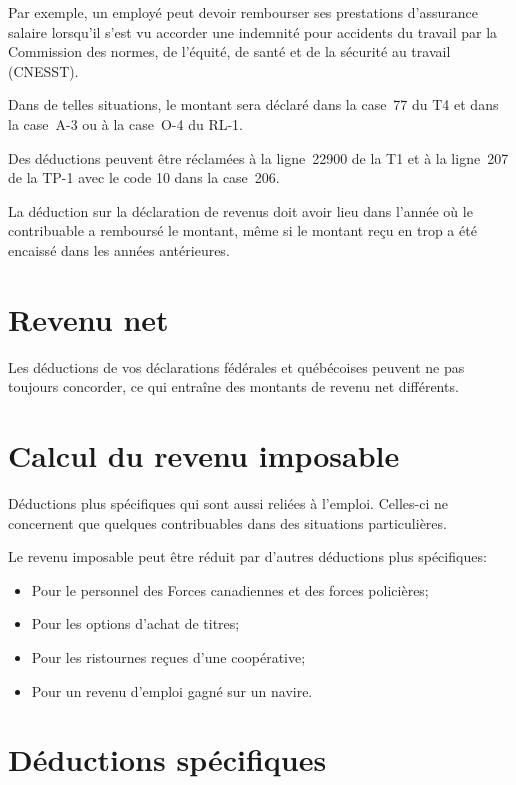 Par exemple, un employé peut devoir rembourser ses prestations d'assurance salaire lorsqu'il s'est vu accorder une indemnité pour accidents du travail par la Commission des normes, de l'équité, de santé et de la sécurité au travail (CNESST).

Dans de telles situations, le montant sera déclaré dans la case~77 du T4 et dans la case~A-3 ou à la case~O-4 du RL-1.

Des déductions peuvent être réclamées à la ligne~22900 de la T1 et à la ligne~207 de la TP-1 avec le code 10 dans la case~206.

La déduction sur la déclaration de revenus doit avoir lieu dans l'année où le contribuable a remboursé le montant, même si le montant reçu en trop a été encaissé dans les années antérieures.



\section{Revenu net}
Les déductions de vos déclarations fédérales et québécoises peuvent ne pas toujours concorder, ce qui entraîne des montants de revenu net différents.



\section{Calcul du revenu imposable}
\begin{intro}
	Déductions plus spécifiques qui sont aussi reliées à l'emploi. Celles-ci ne concernent que quelques contribuables dans des situations particulières.
\end{intro}

Le revenu imposable peut être réduit par d'autres déductions plus spécifiques:
\begin{itemize}
	\item Pour le personnel des Forces canadiennes et des forces policières;
	\item Pour les options d'achat de titres;
	\item Pour les ristournes reçues d'une coopérative; 
	\item Pour un revenu d'emploi gagné sur un navire.
\end{itemize}



\section{Déductions spécifiques}
